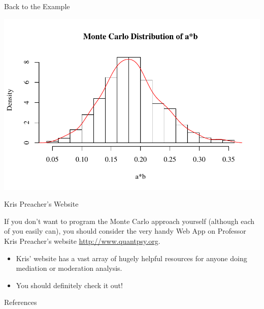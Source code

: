 \documentclass{beamer}
\newcommand{\va}[0]{\vspace{12pt}}
\newcommand{\vb}[0]{\vspace{6pt}}
\begin{document}
\begin{frame}[allowframebreaks]{Back to the Example}
  


\pagebreak


\includegraphics{sweaveFiles/-015}

\pagebreak



\end{frame}


\begin{frame}{Kris Preacher's Website}
  
  If you don't want to program the Monte Carlo approach yourself
  (although each of you easily can), you should consider the very
  handy Web App on Professor Kris Preacher's website
  \url{http://www.quantpsy.org}.  
  \va
  \begin{itemize}
    \item Kris' website has a vast array of hugely helpful resources
      for anyone doing mediation or moderation analysis.
      \vb 
    \item You should definitely check it out!
  \end{itemize}
  
\end{frame}



\begin{frame}{References}


\end{frame}
\end{document}

